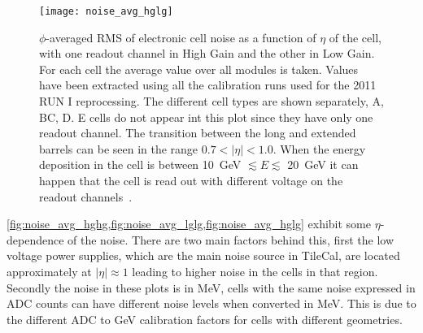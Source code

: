 \begin{figure}[!htb]
  \centering
    \texttt{[image: noise\_avg\_hglg]}
    \caption{$\phi$-averaged RMS of electronic cell noise as a function of
      $\eta$ of the cell, with one readout channel in High Gain and the other in
      Low Gain. For each cell the average value over all modules is
      taken. Values have been extracted using all the calibration runs used for
      the 2011 RUN I reprocessing. The different cell types are shown
      separately, A, BC, D. E cells do not appear int this plot since they have
      only one readout channel. The transition between the long and extended
      barrels can be seen in the range $0.7 < |\eta| < 1.0$. When the energy
      deposition in the cell is between 10~GeV $\lesssim E \lesssim$ 20~GeV it
      can happen that the cell is read out with different voltage on the readout
      channels~\cite{MyTileCalPlots}.}
    \label{fig:noise_avg_hglg}
\end{figure}

\cref{fig:noise_avg_hghg,fig:noise_avg_lglg,fig:noise_avg_hglg} exhibit some
$\eta$-dependence of the noise. There are two main factors behind this, first
the low voltage power supplies, which are the main noise source in TileCal, are
located approximately at $|\eta| \approx 1$ leading to higher noise in the cells
in that region. Secondly the noise in these plots is in MeV, cells with the same
noise expressed in ADC counts can have different noise levels when converted in
MeV. This is due to the different ADC to GeV calibration factors for cells with
different geometries.
